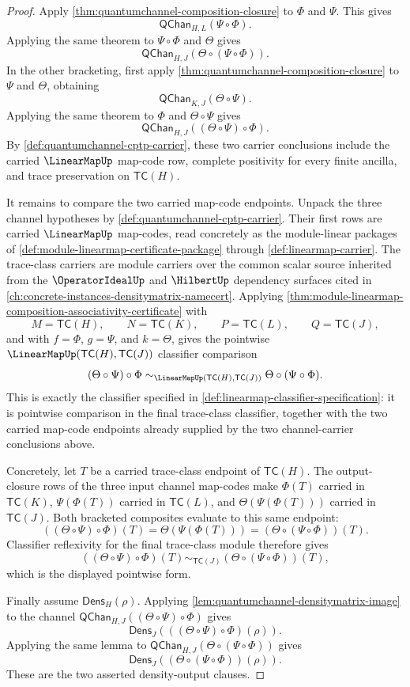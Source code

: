 \begin{proof}
Apply \autoref{thm:quantumchannel-composition-closure} to $\Phi$ and $\Psi$. This gives
$$
\mathsf{QChan}_{H,L}(\Psi\circ\Phi).
$$
Applying the same theorem to $\Psi\circ\Phi$ and $\Theta$ gives
$$
\mathsf{QChan}_{H,J}(\Theta\circ(\Psi\circ\Phi)).
$$
In the other bracketing, first apply \autoref{thm:quantumchannel-composition-closure} to $\Psi$ and $\Theta$, obtaining
$$
\mathsf{QChan}_{K,J}(\Theta\circ\Psi).
$$
Applying the same theorem to $\Phi$ and $\Theta\circ\Psi$ gives
$$
\mathsf{QChan}_{H,J}((\Theta\circ\Psi)\circ\Phi).
$$
By \autoref{def:quantumchannel-cptp-carrier}, these two carrier conclusions include the carried $\LinearMapUp$ map-code row, complete positivity for every finite ancilla, and trace preservation on $\mathsf{TC}(H)$.

It remains to compare the two carried map-code endpoints. Unpack the three channel hypotheses by \autoref{def:quantumchannel-cptp-carrier}. Their first rows are carried $\LinearMapUp$ map-codes, read concretely as the module-linear packages of \autoref{def:module-linearmap-certificate-package} through \autoref{def:linearmap-carrier}. The trace-class carriers are module carriers over the common scalar source inherited from the $\OperatorIdealUp$ and $\HilbertUp$ dependency surfaces cited in \autoref{ch:concrete-instances-densitymatrix-namecert}. Applying \autoref{thm:module-linearmap-composition-associativity-certificate} with
$$
M=\mathsf{TC}(H),\qquad
N=\mathsf{TC}(K),\qquad
P=\mathsf{TC}(L),\qquad
Q=\mathsf{TC}(J),
$$
and with $f=\Phi$, $g=\Psi$, and $k=\Theta$, gives the pointwise $\LinearMapUp(\mathsf{TC}(H),\mathsf{TC}(J))$ classifier comparison
$$
(\Theta\circ\Psi)\circ\Phi
\sim_{\LinearMapUp(\mathsf{TC}(H),\mathsf{TC}(J))}
\Theta\circ(\Psi\circ\Phi).
$$
This is exactly the classifier specified in \autoref{def:linearmap-classifier-specification}: it is pointwise comparison in the final trace-class classifier, together with the two carried map-code endpoints already supplied by the two channel-carrier conclusions above.

Concretely, let $T$ be a carried trace-class endpoint of $\mathsf{TC}(H)$. The output-closure rows of the three input channel map-codes make $\Phi(T)$ carried in $\mathsf{TC}(K)$, $\Psi(\Phi(T))$ carried in $\mathsf{TC}(L)$, and $\Theta(\Psi(\Phi(T)))$ carried in $\mathsf{TC}(J)$. Both bracketed composites evaluate to this same endpoint:
$$
((\Theta\circ\Psi)\circ\Phi)(T)
=
\Theta(\Psi(\Phi(T)))
=
(\Theta\circ(\Psi\circ\Phi))(T).
$$
Classifier reflexivity for the final trace-class module therefore gives
$$
((\Theta\circ\Psi)\circ\Phi)(T)
\sim_{\mathsf{TC}(J)}
(\Theta\circ(\Psi\circ\Phi))(T),
$$
which is the displayed pointwise form.

Finally assume $\mathsf{Dens}_H(\rho)$. Applying \autoref{lem:quantumchannel-densitymatrix-image} to the channel $\mathsf{QChan}_{H,J}((\Theta\circ\Psi)\circ\Phi)$ gives
$$
\mathsf{Dens}_J(((\Theta\circ\Psi)\circ\Phi)(\rho)).
$$
Applying the same lemma to $\mathsf{QChan}_{H,J}(\Theta\circ(\Psi\circ\Phi))$ gives
$$
\mathsf{Dens}_J((\Theta\circ(\Psi\circ\Phi))(\rho)).
$$
These are the two asserted density-output clauses.
\end{proof}


